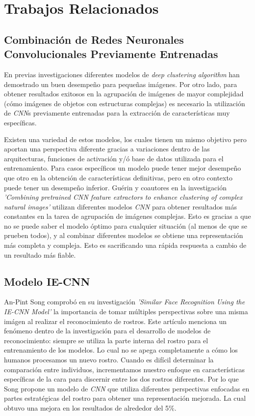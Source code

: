 \documentclass[letterpaper, 10 pt, conference]{ieeeconf}  %
\begin{document}
    \section{Trabajos Relacionados}

    \subsection{Combinación de Redes Neuronales Convolucionales Previamente Entrenadas}
    En previas investigaciones diferentes modelos de \textit{deep clustering algorithm}
    han demostrado un buen desempeño para pequeñas imágenes. Por otro lado, para
    obtener resultados exitosos en la agrupación de imágenes de mayor complejidad
    (cómo imágenes de objetos con estructuras complejas) es necesario la utilización
    de \textit{CNN}s previamente entrenadas para la extracción de características muy específicas.
    
    Existen una variedad de estos modelos, los cuales tienen un mismo objetivo pero aportan una
    perspectiva diferente gracias a variaciones dentro de las arquitecturas, funciones de
    activación y/ó base de datos utilizada para el entrenamiento. Para casos específicos un modelo
    puede tener mejor desempeño que otro en la obtención de características definitivas, pero en
    otro contexto puede tener un desempeño inferior. Guérin y coautores en la investigación
    \textit{'Combining pretrained CNN feature extractors to enhance clustering of complex natural images'}
    utilizan diferentes modelos \textit{CNN} para obtener resultados más constantes en la tarea de
    agrupación de imágenes complejas. Esto es gracias a que no se puede saber el modelo óptimo para
    cualquier situación (al menos de que se prueben todos), y al combinar diferentes modelos se
    obtiene una representación más completa y compleja. Esto es sacrificando una rápida respuesta
    a cambio de un resultado más fiable.\cite{CombiningCNN}


    \subsection{Modelo IE-CNN}
    An-Pint Song comprobó en su investigación \textit{'Similar Face Recognition Using the IE-CNN
    Model'} la importancia de tomar múltiples perspectivas sobre una misma imágen al realizar el
    reconocimiento de rostros. Este artículo menciona un fenómeno dentro de la investigación para
    el desarrollo de modelos de reconocimiento: siempre se utiliza la parte interna del rostro
    para el entrenamiento de los modelos. Lo cual no se apega completamente a cómo los humanos
    procesamos un nuevo rostro. Cuando es difícil determinar la comparación entre individuos,
    incrementamos nuestro enfoque en características específicas de la cara para discernir entre los
    dos rostros diferentes. \cite{Young1987} \cite{Andrews2010} Por lo que Song propone un modelo
    de \textit{CNN} que utiliza diferentes perspectivas enfocadas en partes estratégicas del rostro
    para obtener una representación mejorada. La cual obtuvo una mejora en los resultados de
    alrededor del 5\%. \cite{IECNN}
\end{document}
